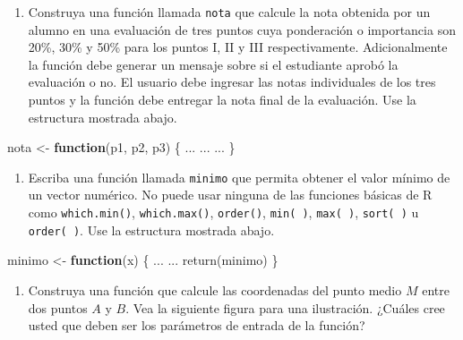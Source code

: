 \documentclass[
]{book}
\makeatletter
\newenvironment{Shaded}{\begin{snugshade}}{\end{snugshade}}
\newcommand{\ControlFlowTok}[1]{\textcolor[rgb]{0.13,0.29,0.53}{\textbf{#1}}}
\newcommand{\FunctionTok}[1]{\textcolor[rgb]{0.00,0.00,0.00}{#1}}
\newcommand{\NormalTok}[1]{#1}
\newcommand{\OtherTok}[1]{\textcolor[rgb]{0.56,0.35,0.01}{#1}}
\providecommand{\tightlist}{%
  \setlength{\itemsep}{0pt}\setlength{\parskip}{0pt}}
\newenvironment{kframe}{%
\medskip{}
\setlength{\fboxsep}{.8em}
 \def\at@end@of@kframe{}%
 \ifinner\ifhmode%
  \def\at@end@of@kframe{\end{minipage}}%
  \begin{minipage}{\columnwidth}%
 \fi\fi%
 \def\FrameCommand##1{\hskip\@totalleftmargin \hskip-\fboxsep
 \colorbox{shadecolor}{##1}\hskip-\fboxsep
     \hskip-\linewidth \hskip-\@totalleftmargin \hskip\columnwidth}%
 \MakeFramed {\advance\hsize-\width
   \@totalleftmargin\z@ \linewidth\hsize
   \@setminipage}}%
 {\par\unskip\endMakeFramed%
 \at@end@of@kframe}
\renewenvironment{Shaded}{\begin{kframe}}{\end{kframe}}
\makeatother
\begin{document}
\begin{enumerate}
\def\labelenumi{\arabic{enumi}.}
\setcounter{enumi}{8}
\tightlist
\item
  Construya una función llamada \texttt{nota} que calcule la nota obtenida por un alumno en una evaluación de tres puntos cuya ponderación o importancia son 20\%, 30\% y 50\% para los puntos I, II y III respectivamente. Adicionalmente la función debe generar un mensaje sobre si el estudiante aprobó la evaluación o no. El usuario debe ingresar las notas individuales de los tres puntos y la función debe entregar la nota final de la evaluación. Use la estructura mostrada abajo.
\end{enumerate}

\begin{Shaded}
\begin{Highlighting}[]
\NormalTok{nota }\OtherTok{\textless{}{-}} \ControlFlowTok{function}\NormalTok{(p1, p2, p3) \{}
\NormalTok{  ...}
\NormalTok{  ...}
\NormalTok{  ...}
\NormalTok{\}}
\end{Highlighting}
\end{Shaded}

\begin{enumerate}
\def\labelenumi{\arabic{enumi}.}
\setcounter{enumi}{9}
\tightlist
\item
  Escriba una función llamada \texttt{minimo} que permita obtener el valor mínimo de un vector numérico. No puede usar ninguna de las funciones básicas de R como \texttt{which.min()}, \texttt{which.max()}, \texttt{order()}, \texttt{min(\ )}, \texttt{max(\ )}, \texttt{sort(\ )} u \texttt{order(\ )}. Use la estructura mostrada abajo.
\end{enumerate}

\begin{Shaded}
\begin{Highlighting}[]
\NormalTok{minimo }\OtherTok{\textless{}{-}} \ControlFlowTok{function}\NormalTok{(x) \{}
\NormalTok{  ...}
\NormalTok{  ...}
  \FunctionTok{return}\NormalTok{(minimo)}
\NormalTok{\}}
\end{Highlighting}
\end{Shaded}

\begin{enumerate}
\def\labelenumi{\arabic{enumi}.}
\setcounter{enumi}{10}
\tightlist
\item
  Construya una función que calcule las coordenadas del punto medio \(M\) entre dos puntos \(A\) y \(B\). Vea la siguiente figura para una ilustración. ¿Cuáles cree usted que deben ser los parámetros de entrada de la función?
\end{enumerate}
\end{document}
